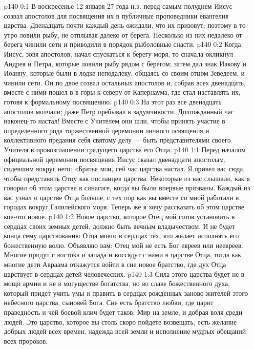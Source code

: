 \author{Комиссия срединников}
\vs p140 0:1 В воскресенье 12 января 27 года н.э. перед самым полуднем Иисус созвал апостолов для посвящения их в публичные проповедники евангелия царства. Двенадцать почти каждый день ожидали, что их призовут; поэтому в то утро ловили рыбу, не отплывая далеко от берега. Несколько из них недалеко от берега чинили сети и приводили в порядок рыболовные снасти.
\vs p140 0:2 Когда Иисус, зовя апостолов, начал спускаться к берегу моря, то сначала окликнул Андрея и Петра, которые ловили рыбу рядом с берегом; затем дал знак Иакову и Иоанну, которые были в лодке неподалеку, общаясь со своим отцом Зеведеем, и чинили сети. Он по двое созвал остальных апостолов и, собрав всех двенадцать, вместе с ними пошел в в горы к северу от Капернаума, где стал наставлять их, готовя к формальному посвящению.
\vs p140 0:3 На этот раз все двенадцать апостолов молчали; даже Петр пребывал в задумчивости. Долгожданный час наконец\hyp{}то настал! Вместе с Учителем они шли, чтобы принять участие в определенного рода торжественной церемонии личного освящения и коллективного предания себя святому делу --- быть представителями своего Учителя в провозглашении грядущего царства его Отца.
\vs p140 1:1 Перед началом официальной церемонии посвящения Иисус сказал двенадцати апостолам, сидевшим вокруг него: «Братья мои, сей час царства настал. Я привел вас сюда, чтобы представить Отцу как посланцев царства. Некоторые из вас слышали, как я говорил об этом царстве в синагоге, когда вы были впервые призваны. Каждый из вас узнал о царстве Отца больше, с тех пор как вы вместе со мной работали в городах вокруг Галилейского моря. Теперь же я хочу рассказать об этом царстве кое\hyp{}что новое.
\vs p140 1:2 Новое царство, которое Отец мой готов установить в сердцах своих земных детей, должно быть вечным владычеством. И не будет конца сему царствованию Отца моего в сердцах тех, кто желает исполнять его божественную волю. Объявляю вам: Отец мой не есть Бог евреев или неевреев. Многие придут с востока и запада и воссядут с нами в царстве Отца, тогда как многие дети Авраама откажутся войти в сие новое братство, где дух Отца царствует в сердцах детей человеческих.
\vs p140 1:3 Сила этого царства будет не в мощи армии и не в могуществе богатства, но во славе божественного духа, который придет учить умы и править в сердцах рожденных заново жителей этого небесного царства, сыновей Бога. Сие есть братство любви, где царит праведность и чей боевой клич будет таков: Мир на земле, и добрая воля среди людей. Это царство, которое вы столь скоро пойдете возвещать, есть желание добрых людей всех времен, надежда всей земли и исполнение мудрых обещаний всех пророков.
